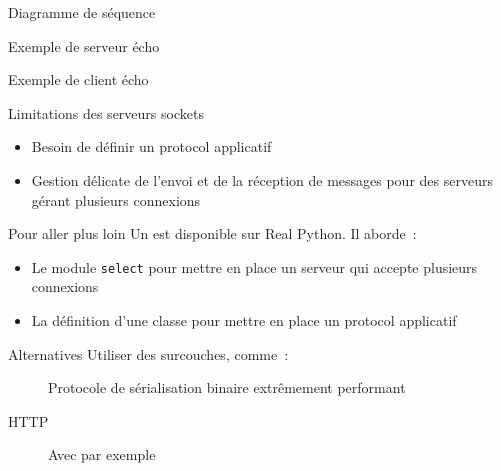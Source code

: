 \begin{frame}{Diagramme de séquence}
\end{frame}

\begin{frame}{Exemple de serveur écho}
\end{frame}

\begin{frame}{Exemple de client écho}
\end{frame}

\begin{frame}{Limitations des serveurs sockets}
  \begin{itemize}
    \item Besoin de définir un protocol applicatif
    \item Gestion délicate de l'envoi et de la réception de messages pour des serveurs gérant plusieurs connexions
  \end{itemize}
\end{frame}

\begin{frame}{Pour aller plus loin}
  Un  est disponible sur Real Python. Il aborde~:

  \begin{itemize}
    \item Le module \texttt{select} pour mettre en place un serveur qui accepte plusieurs connexions
    \item La définition d'une classe pour mettre en place un protocol applicatif
  \end{itemize}

\end{frame}

\begin{frame}{Alternatives}
  Utiliser des surcouches, comme~:
  \begin{description}
    \item[] Protocole de sérialisation binaire extrêmement performant
    \item[HTTP] Avec par exemple 
  \end{description}
\end{frame}
